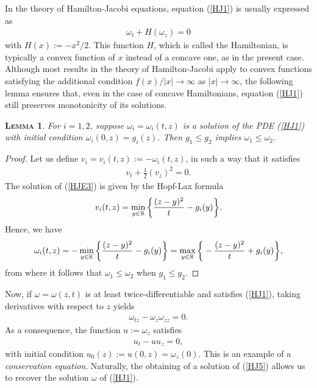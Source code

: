 \documentclass[12pt,twoside]{amsart}
\newtheorem{lem}{\textsc{Lemma}}[section]
\numberwithin{equation}{section}
\begin{document}
\begin{appendices}
In the theory of Hamilton-Jacobi equations, equation (\ref{HJ1}) is usually expressed as
\begin{eqnarray}
\omega_{t} +H(\omega_{z}) = 0 \nonumber
\end{eqnarray}
with $H(x) := -x^{2}/2$. This function $H$, which is called the Hamiltonian, is typically a convex function of $x$ instead of a concave one, as in the present case. Although most results in the theory of Hamilton-Jacobi apply to convex functions satisfying the additional condition $f(x)/|x| \to \infty$ as $|x| \to \infty$, the following lemma ensures that, even in the case of concave Hamiltonians, equation (\ref{HJ1}) still preserves monotonicity of its solutions.

\begin{lem} \label{comparisionlemma} For $i=1,2$, suppose $\omega_{i} = \omega_{i}(t,z)$ is a solution of the PDE (\ref{HJ1}) with initial condition $\omega_{i}(0,z) = g_{i}(z)$. Then $g_{1} \le g_{2}$ implies $\omega_{1} \le \omega_{2}$. 
\end{lem}
\begin{proof}
Let us define $v_{i} = v_{i}(t,z) := -\omega_{i}(t,z)$, in such a way that it satisfies
\begin{eqnarray}
v_{t} + \frac{1}{2}(v_{z})^{2} = 0. \label{HJE3}
\end{eqnarray}
The solution of (\ref{HJE3}) is given by the Hopf-Lax formula \cite{evans1998partial} 
\begin{eqnarray}
v_{i}(t,z) = \min_{y \in \mathbb{R}}\bigg{\{} \frac{(z-y)^{2}}{t} - g_{i}(y) \bigg{\}}. \nonumber
\end{eqnarray}
Hence, we have
\begin{eqnarray}
\omega_{i}(t,z) = -\min_{y \in \mathbb{R}}\bigg{\{} \frac{(z-y)^{2}}{t} - g_{i}(y) \bigg{\}} = \max_{y \in \mathbb{R}}\bigg{\{} -\frac{(z-y)^{2}}{t} + g_{i}(y) \bigg{\}}, \nonumber
\end{eqnarray}
from where it follows that $\omega_{1} \le \omega_{2}$ when $g_{1} \le g_{2}$. 
\end{proof}

Now, if $\omega = \omega(z,t)$ is at least twice-differentiable and satisfies (\ref{HJ1}), taking derivatives with respect to $z$ yields
\begin{eqnarray}
\omega_{tz} - \omega_{z}\omega_{zz} = 0. \label{HJ4}
\end{eqnarray}
As a consequence, the function $u:= \omega_{z}$ satisfies
\begin{eqnarray}
u_{t} - uu_{z} = 0, \label{HJ5}
\end{eqnarray}
with initial condition $u_{0}(z) := u(0,z) = \omega_{z}(0)$. This is an example of a \textit{conservation equation}. Naturally, the obtaining of a solution of (\ref{HJ5}) allows us to recover the solution $\omega$ of (\ref{HJ1}). 


\end{appendices}
\end{document}
